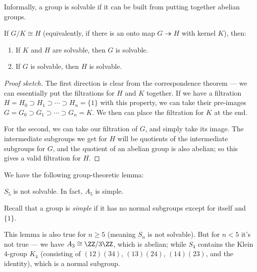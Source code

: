 Informally, a group is solvable if it can be built from putting together abelian groups. 

\begin{lemma}
    If $G/K \cong H$ (equivalently, if there is an onto map $G \twoheadrightarrow H$ with kernel $K$), then:
    \begin{enumerate}
        \item If $K$ and $H$ are solvable, then $G$ is solvable. 
        \item If $G$ is solvable, then $H$ is solvable. 
    \end{enumerate}
\end{lemma}

\begin{proof}[Proof sketch]
    The first direction is clear from the correspondence theorem --- we can essentially put the filtrations for $H$ and $K$ together. If we have a filtration $H = H_0 \supset H_1 \supset \cdots \supset H_n = \{1\}$ with this property, we can take their pre-images $G = G_0 \supset G_1 \supset \cdots \supset G_n = K$. We then can place the filtration for $K$ at the end. 
    
    For the second, we can take our filtration of $G$, and simply take its image. The intermediate subgroups we get for $H$ will be quotients of the intermediate subgroups for $G$, and the quotient of an abelian group is also abelian; so this gives a valid filtration for $H$. 
\end{proof}

We have the following group-theoretic lemma:

\begin{lemma}
    $S_5$ is not solvable. In fact, $A_5$ is simple.
\end{lemma}

Recall that a group is \emph{simple} if it has no normal subgroups except for itself and $\{1\}$. 

This lemma is also true for $n \geq 5$ (meaning $S_n$ is not solvable). But for $n < 5$ it's not true --- we have $A_3 \cong \ZZ/3\ZZ$, which is abelian; while $S_4$ contains the Klein $4$-group $K_4$ (consisting of $(12)(34)$, $(13)(24)$, $(14)(23)$, and the identity), which is a normal subgroup. 

